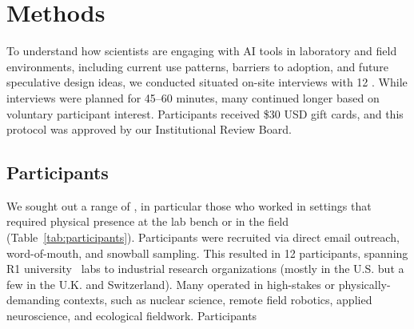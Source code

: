 \section{Methods}

To understand how scientists are engaging with AI tools in laboratory and field environments, including current use patterns, barriers to adoption, and future speculative design ideas, we conducted situated on-site interviews with 12 . While interviews were planned for 45--60 minutes, many continued longer based on voluntary participant interest. Participants received \$30 USD gift cards, and this protocol was approved by our Institutional Review Board.

\subsection{Participants}

We sought out a range of , in particular those who worked in settings that required physical presence at the lab bench or in the field (Table~\ref{tab:participants}). Participants were recruited via direct email outreach, word-of-mouth, and snowball sampling. This resulted in 12 participants, spanning R1 university~\cite{wikipedia_r1} labs to industrial research organizations (mostly in the U.S. but a few in the U.K. and Switzerland). Many operated in high-stakes or physically-demanding contexts, such as nuclear science, remote field robotics, applied neuroscience, and ecological fieldwork. Participants  

